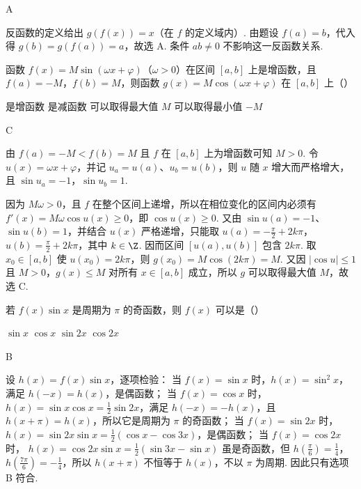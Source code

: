 \documentclass[UTF8,a4paper,oneside,11pt]{ctexbook}
\begin{document}
\begin{answer}
A
\end{answer}

\begin{solution}
反函数的定义给出 \(g(f(x))=x\)（在 \(f\) 的定义域内）. 由题设 \(f(a)=b\)，代入得
\(g(b)=g(f(a))=a\)，故选 A. 条件 \(ab\neq0\) 不影响这一反函数关系.
\end{solution}

\begin{problem}
函数 \(f(x)=M\sin(\omega x+\varphi)\)（\(\omega>0\)）在区间 \([a,b]\) 上是增函数，且 \(f(a)=-M\)，\(f(b)=M\)，则函数 \(g(x)=M\cos(\omega x+\varphi)\) 在 \([a,b]\) 上（\quad）

\choices
    {是增函数}
    {是减函数}
    {可以取得最大值 \(M\)}
    {可以取得最小值 \(-M\)}
\end{problem}

\begin{answer}
C
\end{answer}

\begin{solution}
由 \(f(a)=-M<f(b)=M\) 且 \(f\) 在 \([a,b]\) 上为增函数可知 \(M>0\). 令 \(u(x)=\omega x+\varphi\)，并记 \(u_a=u(a)\)、\(u_b=u(b)\)，则 \(u\) 随 \(x\) 增大而严格增大，且
\(\sin u_a=-1\)，\(\sin u_b=1\).

因为 \(M\omega>0\)，且 \(f\) 在整个区间上递增，所以在相位变化的区间内必须有
\(f'(x)=M\omega\cos u(x)\geqslant0\)，即 \(\cos u(x)\geqslant0\). 又由 \(\sin u(a)=-1\)、\(\sin u(b)=1\)，并结合 \(u(x)\) 严格递增，只能取
\(u(a)=-\frac{\pi}{2}+2k\pi\)，\(u(b)=\frac{\pi}{2}+2k\pi\)，其中 \(k\in\Z\). 因而区间 \([u(a),u(b)]\) 包含 \(2k\pi\). 取 \(x_0\in[a,b]\) 使 \(u(x_0)=2k\pi\)，则
\(g(x_0)=M\cos(2k\pi)=M\). 又因 \(|\cos u|\leqslant1\) 且 \(M>0\)，\(g(x)\leqslant M\) 对所有 \(x\in[a,b]\) 成立，所以 \(g\) 可以取得最大值 \(M\)，故选 C.
\end{solution}

\begin{problem}
若 \(f(x)\sin x\) 是周期为 \(\pi\) 的奇函数，则 \(f(x)\) 可以是（\quad）

\choices
    {\(\sin x\)}
    {\(\cos x \)}
    {\(\sin 2x \)}
    {\(\cos 2x \)}
\end{problem}

\begin{answer}
B
\end{answer}

\begin{solution}
设 \(h(x)=f(x)\sin x\)，逐项检验：
当 \(f(x)=\sin x\) 时，\(h(x)=\sin^2x\)，满足 \(h(-x)=h(x)\)，是偶函数；
当 \(f(x)=\cos x\) 时，
\(h(x)=\sin x\cos x=\frac{1}{2}\sin 2x\)，满足 \(h(-x)=-h(x)\)，且 \(h(x+\pi)=h(x)\)，所以它是周期为 \(\pi\) 的奇函数；
当 \(f(x)=\sin2x\) 时，
\(h(x)=\sin2x\sin x=\frac{1}{2}(\cos x-\cos3x)\)，是偶函数；
当 \(f(x)=\cos2x\) 时，
\(h(x)=\cos2x\sin x=\frac{1}{2}(\sin3x-\sin x)\) 虽是奇函数，但
\(h(\frac{\pi}{6})=\frac{1}{4}\)，\(h(\frac{7\pi}{6})=-\frac{1}{4}\)，所以 \(h(x+\pi)\) 不恒等于 \(h(x)\)，不以 \(\pi\) 为周期. 因此只有选项 B 符合.
\end{solution}
\end{document}
